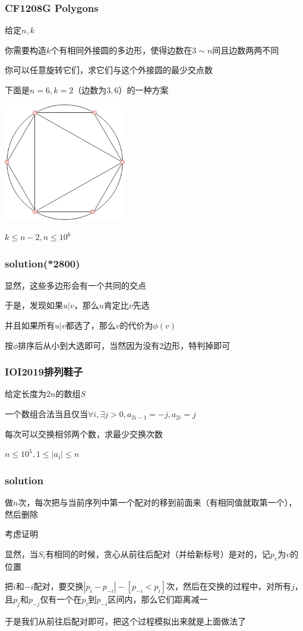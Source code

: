 \documentclass[10pt]{beamer}
\begin{document}
	
	\begin{frame}
		\frametitle{CF1208G Polygons}
		\par 给定$n,k$
		\par 你需要构造$k$个有相同外接圆的多边形，使得边数在$3\sim n$间且边数两两不同
		\par 你可以任意旋转它们，求它们与这个外接圆的最少交点数
		\par 下面是$n=6,k=2$（边数为$3,6$）的一种方案
		\par \includegraphics[width = 0.4\textwidth]{1.png}
		\par $k\le n-2,n\le 10^6$
	\end{frame}
	\clearpage
	\begin{frame}
		\frametitle{solution(*2800)}
		显然，这些多边形会有一个共同的交点

		于是，发现如果$u|v$，那么$u$肯定比$v$先选

		并且如果所有$u|v$都选了，那么$v$的代价为$\phi(v)$

		按$\phi$排序后从小到大选即可，当然因为没有$2$边形，特判掉即可
	\end{frame}
	\clearpage
	\begin{frame}
		\frametitle{IOI2019排列鞋子}
		\par 给定长度为$2n$的数组$S$
		\par 一个数组合法当且仅当$\forall i,\exists j>0,a_{2i-1}=-j,a_{2i}=j$
		\par 每次可以交换相邻两个数，求最少交换次数
		\par $n\le 10^5,1\le |a_i|\le n$
	\end{frame}
	\clearpage
	\begin{frame}
		\frametitle{solution}
		做$n$次，每次把与当前序列中第一个配对的移到前面来（有相同值就取第一个），然后删除

		考虑证明

		显然，当$S_i$有相同的时候，贪心从前往后配对（并给新标号）是对的，记$p_v$为$v$的位置

		把$i$和$−i$配对，要交换$|p_i−p_{−i}|−[p_{−i}<p_i]$次，然后在交换的过程中，对所有$j$，且$p_j$和$p_{−j}$仅有一个在$p_i$到$p_{−i}$区间内，那么它们距离减一

		于是我们从前往后配对即可，把这个过程模拟出来就是上面做法了 
	\end{frame}
\end{document}
